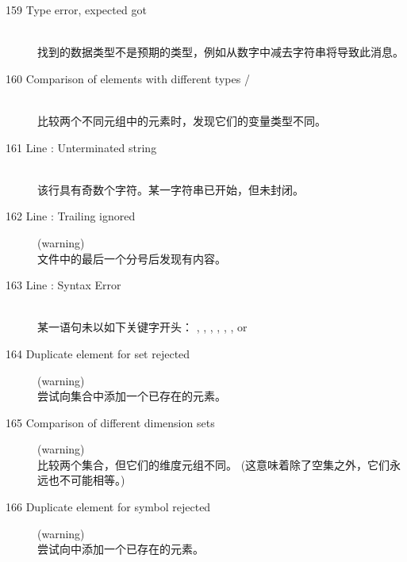 \begin{description}
%
%  
\item[159 Type error, expected  got ]\ \\
  找到的数据类型不是预期的类型，例如从数字中减去字符串将导致此消息。
%
% 
\item[160 Comparison of elements with different types  /
  ]\ \\
  比较两个不同元组中的元素时，发现它们的变量类型不同。
%
%
\item[161 Line : Unterminated string]\ \\
  该行具有奇数个字符。某一字符串已开始，但未封闭。
\item[162 Line : Trailing  ignored] (warning)\ \\
  文件中的最后一个分号后发现有内容。
\item[163 Line : Syntax Error]\ \\
  某一语句未以如下关键字开头：
  , , , , 
  , , or 
%
%
\item[164 Duplicate element  for set rejected] (warning)\ \\
  尝试向集合中添加一个已存在的元素。
\item[165 Comparison of different dimension sets] (warning)\ \\
  比较两个集合，但它们的维度元组不同。
  (这意味着除了空集之外，它们永远也不可能相等。)
%
%
\item[166 Duplicate element  for symbol  rejected]
  (warning)\ \\
  尝试向中添加一个已存在的元素。
%
%

\end{description}
